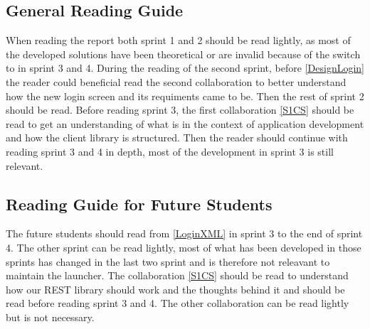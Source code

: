 \subsection{General Reading Guide}
When reading the report both sprint 1 and 2 should be read lightly, as most of
the developed solutions have been theoretical or are invalid because of
the switch to  in sprint 3 and 4. During the reading of the
second sprint, before \autoref{DesignLogin} the reader could beneficial read the second
collaboration to better understand how the new login screen and its requiments
came to be. Then the rest of sprint 2 should be read. Before reading sprint
3, the first collaboration \autoref{S1CS} should be read to get an understanding
of what  is in the context of application development and how the
 client library is structured. Then the reader should continue with
reading sprint 3 and 4 in depth, most of the development in sprint 3 is still
relevant.

\subsection{Reading Guide for Future Students}
The future students should read from \autoref{LoginXML} in sprint 3 to the end
of sprint 4. The other sprint can be read lightly, most of what has been
developed in those sprints has changed in the last two sprint and is
therefore not releavant to maintain the launcher. The collaboration
\autoref{S1CS} should be read to understand how our REST library should work and
the thoughts behind it and should be read before reading sprint 3 and 4. The
other collaboration can be read lightly but is not necessary.


